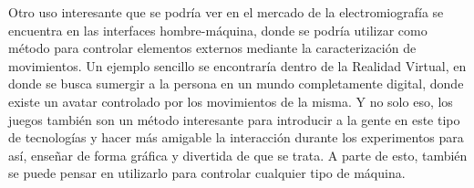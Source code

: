 Otro uso interesante que se podría ver en el mercado de la electromiografía se encuentra en las interfaces hombre-máquina, donde se podría utilizar como método para controlar elementos externos mediante la caracterización de movimientos. Un ejemplo sencillo se encontraría dentro de la Realidad Virtual, en donde se busca sumergir a la persona en un mundo completamente digital, donde existe un avatar controlado por los movimientos de la misma. Y no solo eso, los juegos también son un método interesante para introducir a la gente en este tipo de tecnologías y hacer más amigable la interacción durante los experimentos para así, enseñar de forma gráfica y divertida de que se trata. A parte de esto, también se puede pensar en utilizarlo para controlar cualquier tipo de máquina.\\


